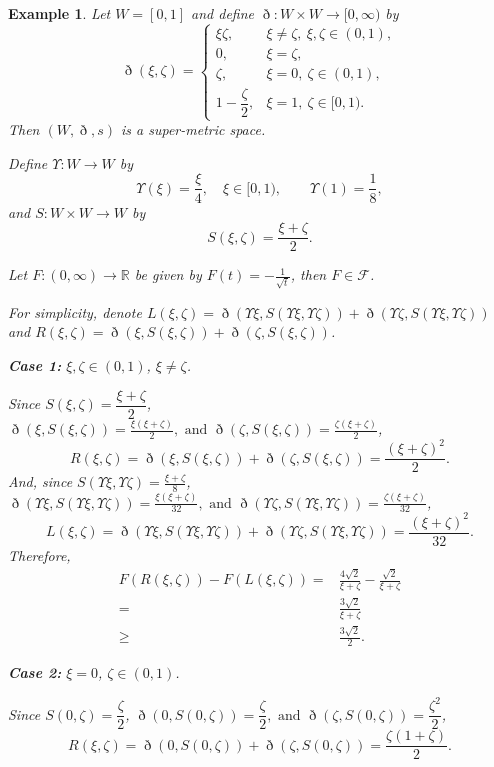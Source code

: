 \documentclass[pdflatex,sn-mathphys-num]{sn-jnl}%
\theoremstyle{thmstyleone}%
\theoremstyle{thmstyletwo}%
\newtheorem{example}{Example}%
\theoremstyle{thmstylethree}%
\begin{document}
\begin{example}
Let $W=[0,1]$ and define $\eth:W\times W\to[0,\infty)$ by
\[
\eth(\xi,\zeta)=
\begin{cases}
\xi\zeta, & \xi \neq \zeta,\ \xi,\zeta \in(0,1),\\[4pt]
0, & \xi =\zeta ,\\[4pt]
\zeta, & \xi =0,\ \zeta \in (0,1),\\[4pt]
1-\dfrac{\zeta}{2}, & \xi =1,\ \zeta \in [0,1).
\end{cases}
\]
 Then $(W,\eth,s)$ is a super-metric space.

Define $\Upsilon :W\to W$ by
\[
\Upsilon(\xi)=\frac{\xi }{4}, \quad \xi \in[0,1), 
\qquad 
\Upsilon(1)=\frac{1}{8},
\]
and $S:W\times W\to W$ by
\[
S(\xi,\zeta)=\frac{\xi+\zeta }{2}.
\]

Let $F:(0,\infty)\to\mathbb{R}$ be given by $F(t)=-\frac{1}{\sqrt{t}}$, then $F\in\mathcal{F}$.


For simplicity, denote $L(\xi ,\zeta)= \eth(\Upsilon \xi,S(\Upsilon \xi,\Upsilon \zeta))+\eth(\Upsilon \zeta,S(\Upsilon \xi,\Upsilon \zeta)) $ and $R(\xi ,\zeta)=\eth(\xi,S(\xi,\zeta))+\eth(\zeta ,S(\xi,\zeta))$.

\medskip

\textbf{Case 1:} $\xi,\zeta \in(0,1)$, $\xi \neq \zeta$.

Since $S(\xi,\zeta)=\dfrac{\xi+\zeta }{2}$, $\eth(\xi,S(\xi,\zeta))=\frac{\xi (\xi+\zeta)}{2},
\text{ and }
\eth(\zeta ,S(\xi,\zeta))=\frac{\zeta (\xi+\zeta)}{2}$,
\[
R(\xi ,\zeta)=\eth(\xi,S(\xi,\zeta))+\eth(\zeta ,S(\xi,\zeta))
=
\frac{(\xi+\zeta)^2}{2}.
\]
And, since $S(\Upsilon \xi,\Upsilon \zeta)=\frac{\xi+\zeta }{8}$, $\eth(\Upsilon \xi,S(\Upsilon \xi,\Upsilon \zeta))=\frac{\xi (\xi+\zeta)}{32},
\text{ and }
\eth(\Upsilon \zeta,S(\Upsilon \xi,\Upsilon \zeta))=\frac{\zeta (\xi+\zeta)}{32}$,
\[
L(\xi ,\zeta)=\eth(\Upsilon \xi,S(\Upsilon \xi,\Upsilon \zeta))+\eth(\Upsilon \zeta,S(\Upsilon \xi,\Upsilon \zeta))
=
\frac{(\xi+\zeta)^2}{32}.
\]
Therefore,
\begin{align*}
    F(R(\xi ,\zeta))-F(L(\xi ,\zeta))
=&\frac{4\sqrt{2}}{\xi+\zeta }-\frac{\sqrt{2}}{\xi+\zeta }\\
=&\frac{3\sqrt{2}}{\xi+\zeta }\\
\ge&
\frac{3\sqrt{2}}{2}.
\end{align*}

\medskip
\textbf{Case 2:} $\xi =0$, $\zeta \in (0,1)$.

Since $S(0,\zeta)=\dfrac{\zeta }{2}$, 
$\eth(0,S(0,\zeta))=\dfrac{\zeta }{2},
\text{ and }
\eth(\zeta ,S(0,\zeta))=\dfrac{\zeta^ 2}{2}$,
\[
R(\xi ,\zeta)=\eth(0,S(0,\zeta))+\eth(\zeta ,S(0,\zeta))
=
\frac{\zeta (1+\zeta)}{2}.
\]


\end{example}
\end{document}

